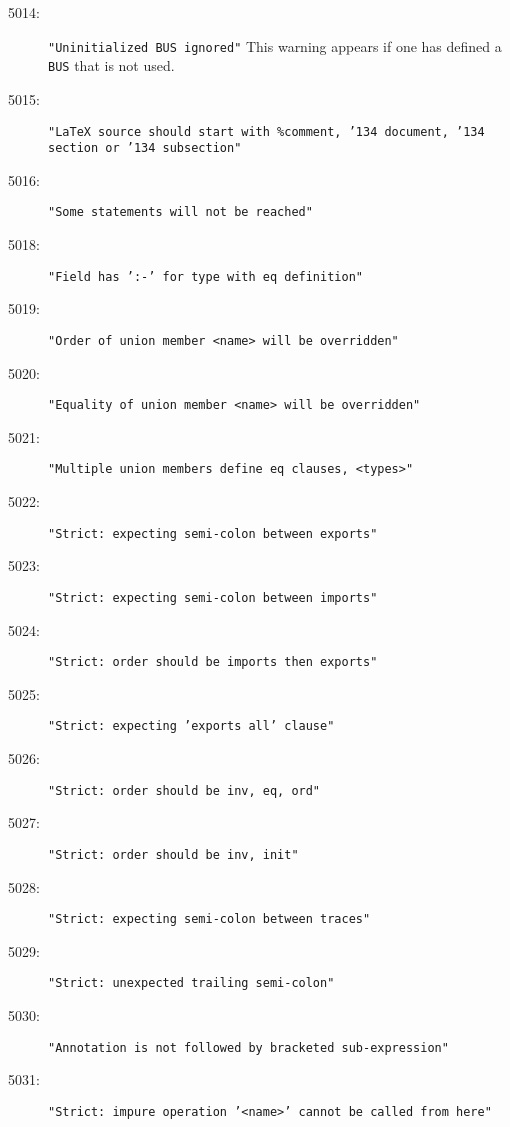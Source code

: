 \begin{description}
\item[5014:] \texttt{"Uninitialized BUS ignored"}  This warning appears
  if one has defined a \texttt{BUS} that is not used.
\item[5015:] \texttt{"LaTeX source should start with \%comment,
  \char'134 document, \char'134 section or \char'134 subsection"  }
\item[5016:] \texttt{"Some statements will not be reached"}
\item[5018:] \texttt{"Field has ':-' for type with eq definition"}
\item[5019:] \texttt{"Order of union member <name> will be overridden"}
\item[5020:] \texttt{"Equality of union member <name> will be overridden"}
\item[5021:] \texttt{"Multiple union members define eq clauses, <types>"}
\item[5022:] \texttt{"Strict: expecting semi-colon between exports"}
\item[5023:] \texttt{"Strict: expecting semi-colon between imports"}
\item[5024:] \texttt{"Strict: order should be imports then exports"}
\item[5025:] \texttt{"Strict: expecting 'exports all' clause"}
\item[5026:] \texttt{"Strict: order should be inv, eq, ord"}
\item[5027:] \texttt{"Strict: order should be inv, init"}
\item[5028:] \texttt{"Strict: expecting semi-colon between traces"}
\item[5029:] \texttt{"Strict: unexpected trailing semi-colon"}
\item[5030:] \texttt{"Annotation is not followed by bracketed sub-expression"}
\item[5031:] \texttt{"Strict: impure operation '<name>' cannot be called from here"}

\end{description}
